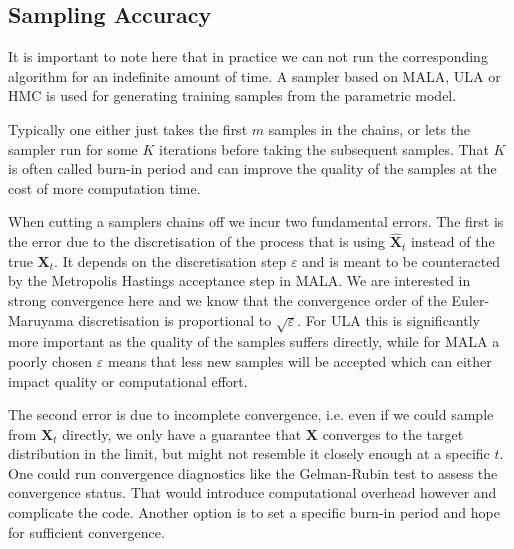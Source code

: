 
\subsection{Sampling Accuracy}

It is important to note here that in practice we can not run the corresponding algorithm for an indefinite amount of time.
A sampler based on MALA, ULA or HMC is used for generating training samples from the parametric model.

Typically one either just takes the first $m$ samples in the chains, or lets the sampler run for some $K$ iterations before taking the subsequent samples.
That $K$ is often called burn-in period and can improve the quality of the samples at the cost of more computation time.

When cutting a samplers chains off we incur two fundamental errors. 
The first is the error due to the discretisation of the process that is using $\hat{\bm{X}}_t$ instead of the true $\bm{X}_t$.
It depends on the discretisation step $\varepsilon$ and is meant to be counteracted by the Metropolis Hastings acceptance step in MALA.
We are interested in strong convergence here and we know that the convergence order of the Euler-Maruyama discretisation is proportional to $\sqrt{\varepsilon}$.
For ULA this is significantly more important as the quality of the samples suffers directly, 
while for MALA a poorly chosen $\varepsilon$ means that less new samples will be accepted which can either impact quality or computational effort.

The second error is due to incomplete convergence, i.e. even if we could sample from $\bm{X}_t$ directly,
we only have a guarantee that $\bm{X}$ converges to the target distribution in the limit, 
but might not resemble it closely enough at a specific $t$.
One could run convergence diagnostics like the Gelman-Rubin test to assess the convergence status.
That would introduce computational overhead however and complicate the code.
Another option is to set a specific burn-in period and hope for sufficient convergence.




